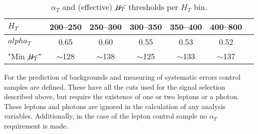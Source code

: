 \begin{table}[h!]
  \caption{$\alpha_T$ and (effective) $\cancel{H_T}$ thresholds per $H_T$ bin.\label{tab:alphat-thresholds}}
  \centering
  \footnotesize
  \begin{tabular}{ lcccccc }
    \hline
    \hline
    $H_T$     & 200--250   & 250--300   & 300--350  & 350--400  & 400--800 \\ %
    \hline                                                                     
    $alpha_T$      & 0.65       & 0.60       & 0.55      & 0.53      & 0.52     \\  %
    "Min $\cancel{H_T}$"   & $\sim$128  & $\sim$138  & $\sim$125 & $\sim$133 & $\sim$137 \\  %
    \hline
    \hline
  \end{tabular}
\end{table}

\noindent For the prediction of backgrounds and measuring of systematic errors control samples are defined. These have all the cuts used for the signal selection described above, but require the existence of one or two leptons or a photon. These leptons and photons are ignored in the calculation of any analysis variables. Additionally, in the case of the lepton control sample no $\alpha_T$ requirement is made.